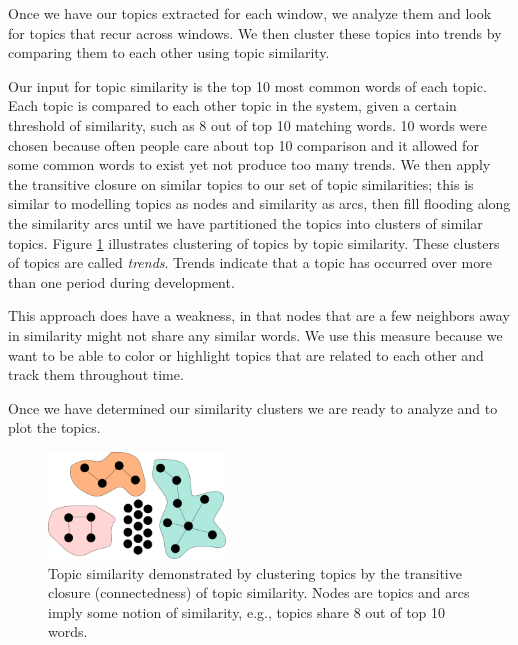 \documentclass[times, 10pt,twocolumn]{article}
\begin{document}
Once we have our topics extracted for each window, we analyze them and
look for topics that recur across windows.  We then cluster these
topics into trends by comparing them to each other using topic similarity.

Our input for topic similarity is the top 10 most common words of each
topic.  Each topic is compared to each other topic in the system,
given a certain threshold of similarity, such as 8 out of
top 10 matching words.  10 words were chosen because often people care
about top 10 comparison and it allowed for some common words to exist
yet not produce too many trends.
We then apply the
transitive closure on similar topics to our set of topic similarities;
this is similar to modelling topics as nodes and similarity as arcs,
then fill flooding along the similarity arcs until we have partitioned
the topics into clusters of similar topics. Figure \ref{fig:closure}
illustrates clustering of topics by topic similarity. These clusters
of topics are called \emph{trends}. 
Trends indicate that a topic has occurred over more than one period during development.

This approach does have a weakness, in that nodes that are a few neighbors
away in similarity might not share any similar words.  We use this
measure because we want to be able to color or highlight topics that
are related to each other and track them throughout time.

Once we have determined our similarity clusters we are ready to analyze
and to plot the topics.

\begin{figure}
  \centering
  \includegraphics[width=0.42\textwidth]{transitiveclosure}
  \caption{Topic similarity demonstrated by clustering topics by the transitive closure (connectedness)
    of topic similarity. Nodes are topics and
    arcs imply 
some notion of similarity, e.g.,  topics share 8 out of  top 10 words.}
\label{fig:closure}
\end{figure}
\end{document}
